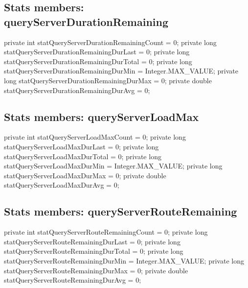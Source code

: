 \subsection{Stats members: queryServerDurationRemaining}
\nwenddocs{}\endmoddef{}
private int    statQueryServerDurationRemainingCount    = 0;
private long   statQueryServerDurationRemainingDurLast  = 0;
private long   statQueryServerDurationRemainingDurTotal = 0;
private long   statQueryServerDurationRemainingDurMin   = Integer.MAX_VALUE;
private long   statQueryServerDurationRemainingDurMax   = 0;
private double statQueryServerDurationRemainingDurAvg   = 0;
\nwendcode{}\nwdocspar

\subsection{Stats members: queryServerLoadMax}
\nwenddocs{}\endmoddef{}
private int    statQueryServerLoadMaxCount    = 0;
private long   statQueryServerLoadMaxDurLast  = 0;
private long   statQueryServerLoadMaxDurTotal = 0;
private long   statQueryServerLoadMaxDurMin   = Integer.MAX_VALUE;
private long   statQueryServerLoadMaxDurMax   = 0;
private double statQueryServerLoadMaxDurAvg   = 0;
\nwendcode{}\nwdocspar

\subsection{Stats members: queryServerRouteRemaining}
\nwenddocs{}\endmoddef{}
private int    statQueryServerRouteRemainingCount    = 0;
private long   statQueryServerRouteRemainingDurLast  = 0;
private long   statQueryServerRouteRemainingDurTotal = 0;
private long   statQueryServerRouteRemainingDurMin   = Integer.MAX_VALUE;
private long   statQueryServerRouteRemainingDurMax   = 0;
private double statQueryServerRouteRemainingDurAvg   = 0;
\nwendcode{}\nwdocspar

